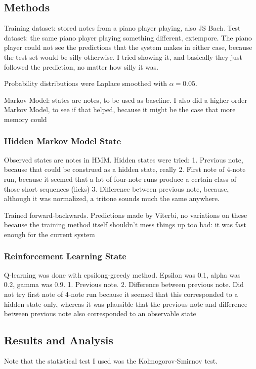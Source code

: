 \documentclass{article}
\begin{document}
\subsection*{Methods}
Training dataset: stored notes from a piano player playing, also JS Bach.
Test dataset: the same piano player playing something different, extempore.
The piano player could not see the predictions that the system makes in either case, because the test set would be silly otherwise. I tried showing it, and basically they just followed the prediction, no matter how silly it was.

Probability distributions were Laplace smoothed with $\alpha = 0.05$.

Markov Model: states are notes, to be used as baseline. I also did a higher-order Markov Model, to see if that helped, because it might be the case that more memory could 

\subsubsection*{Hidden Markov Model State}
Observed states are notes in HMM.
Hidden states were tried:
1. Previous note, because that could be construed as a hidden state, really
2. First note of 4-note run, because it seemed that a lot of four-note runs produce a certain class of those short sequences (licks)
3. Difference between previous note, because, although it was normalized, a tritone sounds much the same anywhere.

Trained forward-backwards. Predictions made by Viterbi, no variations on these because the training method itself shouldn't mess things up too bad: it was fast enough for the current system

\subsubsection*{Reinforcement Learning State}
Q-learning was done with epsilong-greedy method. Epsilon was 0.1, alpha was 0.2, gamma was 0.9. %
1. Previous note.
2. Difference between previous note.
Did not try first note of 4-note run because it seemed that this corresponded to a hidden state only, whereas it was plausible that the previous note and difference between previous note also corresponded to an observable state

\subsection*{Results and Analysis}
Note that the statistical test I used was the Kolmogorov-Smirnov test.
\end{document}
